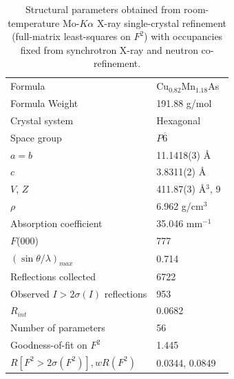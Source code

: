 \documentclass[letterpaper,10pt,doublespacing,edeposit]{uiucthesis2020}
\newcommand*{\cumnas}{Cu$_{0.82}$Mn$_{1.18}$As}
\begin{document}
\begin{mainmatter}

\begin{table}
\caption{\label{tab:sxtl} 
Structural parameters obtained from room-temperature Mo-$K\alpha$ X-ray
single-crystal refinement (full-matrix least-squares on $F^2$) with occupancies fixed from synchrotron X-ray and neutron co-refinement. 
}
\centering
\begin{tabular}{ll}
\hline
Formula								&  \cumnas\ \\
Formula Weight						& 191.88 g/mol\\
Crystal system						& Hexagonal \\
Space group							& $P\overline{6}$\\
$a=b$									& 11.1418(3) \AA \\
$c$									& 3.8311(2) \AA \\
$V$, $Z$ 								& 411.87(3) \AA$^3$, 9 \\
$\rho$ 								& 6.962 g/cm$^3$ \\
Absorption coefficient			& 35.046 mm$^{-1}$ \\
$F$(000) 							& 777 \\ 
$(\sin\theta/\lambda)_{max}$ 					& 0.714 \\
Reflections collected       	& 6722 \\
Observed $I>2\sigma(I)$ reflections       	& 953 \\
$R_{int}$							& 0.0682 \\
Number of parameters 			& 56 \\
Goodness-of-fit on $F^2$		& 1.445 \\
$R[F^2 > 2\sigma(F^2)], wR(F^2)$    &   0.0344, 0.0849 \\
\hline
\end{tabular}
~\\
\end{table}


\end{mainmatter}
\end{document}
